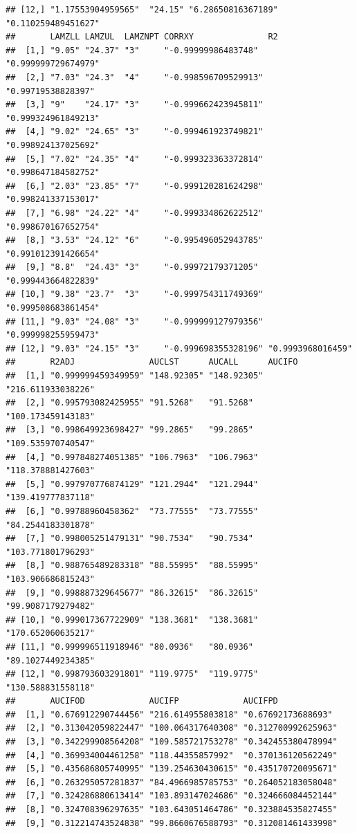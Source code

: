 \documentclass[]{krantz}
\theoremstyle{definition}
\theoremstyle{definition}
\theoremstyle{definition}
\theoremstyle{remark}
\begin{document}
\begin{verbatim}
## [12,] "1.17553904959565"  "24.15" "6.28650816367189" "0.110259489451627" 
##       LAMZLL LAMZUL  LAMZNPT CORRXY               R2                 
##  [1,] "9.05" "24.37" "3"     "-0.99999986483748"  "0.999999729674979"
##  [2,] "7.03" "24.3"  "4"     "-0.998596709529913" "0.99719538828397" 
##  [3,] "9"    "24.17" "3"     "-0.999662423945811" "0.999324961849213"
##  [4,] "9.02" "24.65" "3"     "-0.999461923749821" "0.998924137025692"
##  [5,] "7.02" "24.35" "4"     "-0.999323363372814" "0.998647184582752"
##  [6,] "2.03" "23.85" "7"     "-0.999120281624298" "0.998241337153017"
##  [7,] "6.98" "24.22" "4"     "-0.999334862622512" "0.998670167652754"
##  [8,] "3.53" "24.12" "6"     "-0.995496052943785" "0.991012391426654"
##  [9,] "8.8"  "24.43" "3"     "-0.99972179371205"  "0.999443664822839"
## [10,] "9.38" "23.7"  "3"     "-0.999754311749369" "0.999508683861454"
## [11,] "9.03" "24.08" "3"     "-0.999999127979356" "0.999998255959473"
## [12,] "9.03" "24.15" "3"     "-0.999698355328196" "0.9993968016459"  
##       R2ADJ               AUCLST      AUCALL      AUCIFO            
##  [1,] "0.999999459349959" "148.92305" "148.92305" "216.611933038226"
##  [2,] "0.995793082425955" "91.5268"   "91.5268"   "100.173459143183"
##  [3,] "0.998649923698427" "99.2865"   "99.2865"   "109.535970740547"
##  [4,] "0.997848274051385" "106.7963"  "106.7963"  "118.378881427603"
##  [5,] "0.997970776874129" "121.2944"  "121.2944"  "139.419777837118"
##  [6,] "0.99788960458362"  "73.77555"  "73.77555"  "84.2544183301878"
##  [7,] "0.998005251479131" "90.7534"   "90.7534"   "103.771801796293"
##  [8,] "0.988765489283318" "88.55995"  "88.55995"  "103.906686815243"
##  [9,] "0.998887329645677" "86.32615"  "86.32615"  "99.9087179279482"
## [10,] "0.999017367722909" "138.3681"  "138.3681"  "170.652060635217"
## [11,] "0.999996511918946" "80.0936"   "80.0936"   "89.1027449234385"
## [12,] "0.998793603291801" "119.9775"  "119.9775"  "130.588831558118"
##       AUCIFOD             AUCIFP             AUCIFPD            
##  [1,] "0.676912290744456" "216.614955803818" "0.67692173688693" 
##  [2,] "0.313042059822447" "100.064317640308" "0.312700992625963"
##  [3,] "0.342299908564208" "109.585721753278" "0.342455380478994"
##  [4,] "0.369934004461258" "118.44355857992"  "0.370136120562249"
##  [5,] "0.435686805740995" "139.254630430615" "0.435170720095671"
##  [6,] "0.263295057281837" "84.4966985785753" "0.264052183058048"
##  [7,] "0.324286880613414" "103.893147024686" "0.324666084452144"
##  [8,] "0.324708396297635" "103.643051464786" "0.323884535827455"
##  [9,] "0.312214743524838" "99.8660676588793" "0.312081461433998"

\end{verbatim}
\end{document}
